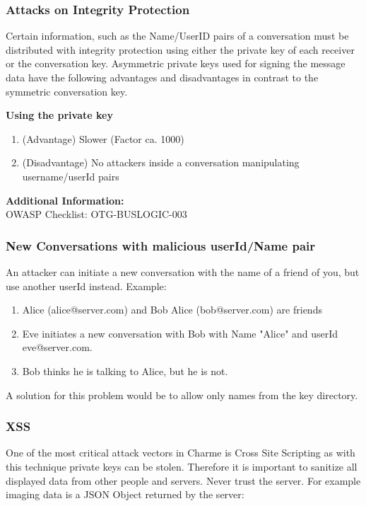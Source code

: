 \documentclass{scrartcl}
\begin{document}
   \subsubsection{Attacks on Integrity Protection}
   Certain information, such as the Name/UserID pairs of a conversation must be distributed with integrity protection using either the private key of each receiver or the conversation key. Asymmetric private keys used for signing the message data have the following advantages and disadvantages in contrast to the symmetric conversation key.
   
   \textbf{Using the private key }
   \begin{enumerate}
   \item (Advantage) Slower (Factor ca. 1000)
    \item (Disadvantage) No attackers inside a conversation manipulating username/userId pairs
   \end{enumerate}
   
        
 
   \textbf{Additional Information:}\\
   OWASP Checklist: OTG-BUSLOGIC-003
   
     \subsubsection{New Conversations with malicious userId/Name pair }
     An attacker can initiate a new conversation with the name of a friend of you, but use another userId instead. Example:
      \begin{enumerate}
     \item Alice (alice@server.com) and Bob Alice (bob@server.com) are friends
     \item Eve initiates a new conversation with Bob with Name "Alice" and userId eve@server.com. 
     \item Bob thinks he is talking to Alice, but he is not.
     \end{enumerate}
     A solution for this problem would be to allow only names from the key directory.
   \subsubsection{XSS}
   One of the most critical attack vectors in Charme is Cross Site Scripting as with this technique private keys can be stolen.
   Therefore it is important to sanitize all displayed data from other people and servers. Never trust the server. For example imaging data is a JSON Object returned by the server:
   
\end{document}
